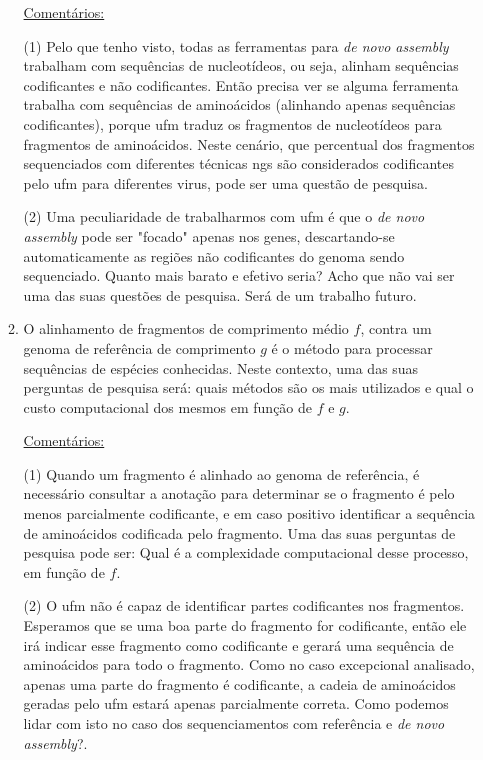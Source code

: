 \documentclass[12pt]{article}
\begin{document}
\begin{itemize}
\begin{enumerate}
                    \underline{Comentários:}

                    (1) Pelo que tenho visto, todas as ferramentas para {\it{de novo assembly}} trabalham com sequências de nucleotídeos, ou seja, alinham sequências codificantes e não codificantes. Então precisa ver se alguma ferramenta trabalha com sequências de aminoácidos (alinhando apenas sequências codificantes), porque \gls{ufm} traduz os fragmentos de nucleotídeos para fragmentos de aminoácidos. Neste cenário, que percentual dos fragmentos sequenciados com diferentes técnicas \gls{ngs} são considerados codificantes pelo \gls{ufm} para diferentes virus, pode ser uma questão de pesquisa.

                    (2) Uma peculiaridade de trabalharmos com \gls{ufm} é que o {\it{de novo assembly}} pode ser "focado" apenas nos genes, descartando-se automaticamente as regiões não codificantes do genoma sendo sequenciado. Quanto mais barato e efetivo seria? Acho que não vai ser uma das suas questões de pesquisa. Será de um trabalho futuro.

              \item O alinhamento de fragmentos de comprimento médio $f$, contra um genoma de referência de comprimento $g$ é o método para processar sequências de espécies conhecidas. Neste contexto, uma das suas perguntas de pesquisa será: quais métodos são os mais utilizados e qual o custo computacional dos mesmos em função de $f$ e $g$.

                    \underline{Comentários:}

                    (1) Quando um fragmento é alinhado ao genoma de referência, é necessário consultar a anotação para determinar se o fragmento é pelo menos parcialmente codificante, e em caso positivo identificar a sequência de aminoácidos codificada pelo fragmento. Uma das suas perguntas de pesquisa pode ser: Qual é a complexidade computacional desse processo, em função de $f$.

                    (2) O \gls{ufm} não é capaz de identificar partes codificantes nos fragmentos. Esperamos que se uma boa parte do fragmento for codificante, então ele irá indicar esse fragmento como codificante e gerará uma sequência de aminoácidos para todo o fragmento. Como no caso excepcional analisado, apenas uma parte do fragmento é codificante, a cadeia de aminoácidos geradas pelo \gls{ufm} estará apenas parcialmente correta. Como podemos lidar com isto no caso dos sequenciamentos com referência e {\it{de novo assembly}}?.


\end{enumerate}
\end{itemize}
\end{document}
